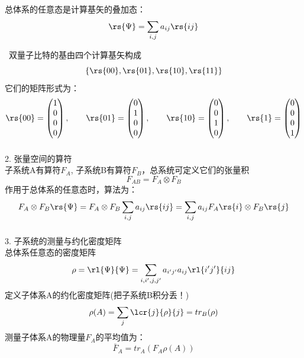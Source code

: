 \begin{frame}
    \frametitle{}
    总体系的任意态是计算基矢的叠加态：
    \[ \rs{\Psi} = \sum_{i,j} a_{ij}\rs{ij}\] \vspace{0.6em}

    \例[写出双量子比特的计算基]{} 
    \解~双量子比特的基由四个计算基矢构成$$\{\rs{00},\rs{01},\rs{10},\rs{11}\}$$
    它们的矩阵形式为：
    \[
\rs{00} = 
\begin{pmatrix}
    1\\
    0\\
    0\\
    0
\end{pmatrix},\qquad
\rs{01} = 
\begin{pmatrix}
    0\\
    1\\
    0\\
    0
\end{pmatrix},\qquad
\rs{10} = 
\begin{pmatrix}
    0\\
    0\\
    1\\
    0
\end{pmatrix},\qquad
\rs{1} = 
\begin{pmatrix}
    0\\
    0\\
    0\\
    1
\end{pmatrix}
\] 
\end{frame}

\begin{frame}
    \frametitle{}
    2. 张量空间的算符 \\
    子系统A有算符$F_A$, 子系统B有算符$F_B$，总系统可定义它们的张量积
    \[F_{AB}=F_A \otimes F_B\]
    作用于总体系的任意态时，算法为：
    \[F_A \otimes F_B \rs{\Psi} = F_A \otimes F_B \sum_{i,j} a_{ij}\rs{ij}=  \sum_{i,j} a_{ij}F_A \rs{i}\otimes F_B\rs{j}\]
    
\end{frame}

\begin{frame}
    \frametitle{}
    3. 子系统的测量与约化密度矩阵 \\
    总体系任意态的密度矩阵
    \[ \rho=\rl{\Psi} {\Psi}= \sum_{i,i',j,j'} a_{i'j'}a_{ij}\rl{i'j'}{ij}\] 
    定义子体系A的约化密度矩阵(把子系统B积分丢！)
    \[ \rho(A)=\sum_{j}\lcr{j}{\rho}{j}=tr_B(\rho)\] 
    测量子体系A的物理量$F_A$的平均值为：
    \[ \bar{F}_A=tr_A(F_A\rho(A))\] 
    
\end{frame}



